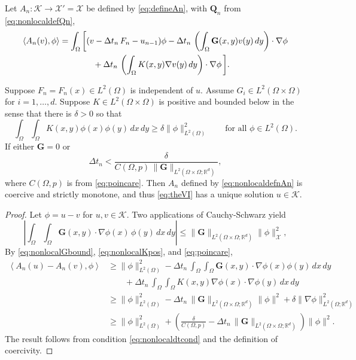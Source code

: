 \documentclass[final,onefignum]{siamart190516}
\newcommand\bG{\mathbf{G}}
\newcommand\bQ{\mathbf{Q}}
\newcommand{\grad}{\nabla}
\newcommand{\ip}[2]{\ensuremath{\left<#1,#2\right>}}
\newcommand\RR{\mathbb{R}}
\begin{document}
Let $A_n:\mathcal{K} \to \mathcal{X}'=\mathcal{X}$ be defined by \eqref{eq:defineAn}, with $\bQ_n$ from \eqref{eq:nonlocaldefQn},
\begin{align}
    \ip{A_n(v)}{\phi} &= \int_\Omega \bigg[(v - \Delta t_n\,F_n - u_{n-1})\phi - \Delta t_n\,\left(\int_\Omega \bG(x,y) v(y)\,dy\right)\cdot \grad \phi \label{eq:nonlocaldefnAn} \\
                      &\qquad\qquad + \Delta t_n\,\left(\int_\Omega K(x,y) \grad v(y)\,dy\right)\cdot \grad \phi\,\bigg]. \notag
\end{align}

\begin{theorem}  \label{thm:nonlocalwellposed}  Suppose $F_n=F_n(x) \in L^2(\Omega)$ is independent of $u$.  Assume $G_i \in L^2(\Omega\times\Omega)$ for $i=1,\dots,d$.  Suppose $K \in L^2(\Omega\times\Omega)$ is positive and bounded below \cite{PorterStirling1990} in the sense that there is $\delta>0$ so that
\begin{equation}
   \int_\Omega \int_\Omega K(x,y) \phi(x) \phi(y)\,dx\,dy \ge \delta \|\phi\|_{L^2(\Omega)}^2 \qquad \text{for all } \phi \in L^2(\Omega).  \label{eq:nonlocalKpos}
\end{equation}
If either $\bG=0$ or
\begin{equation}
  \Delta t_n < \frac{\delta}{C(\Omega,p)\, \|\bG\|_{L^2(\Omega\times\Omega;\RR^d)}},  \label{eq:nonlocaldtcond}
\end{equation}
where $C(\Omega,p)$ is from \eqref{eq:poincare}.  Then $A_n$ defined by \eqref{eq:nonlocaldefnAn} is coercive and strictly monotone, and thus \eqref{eq:theVI} has a unique solution $u\in\mathcal{K}$.
\end{theorem}

\begin{proof}  Let $\phi=u-v$ for $u,v\in\mathcal{K}$.  Two applications of Cauchy-Schwarz yield
\begin{equation}
\left|\int_\Omega \int_\Omega \bG(x,y) \cdot \grad \phi(x)\,\phi(y) \,dx\,dy\right|
  \le \|\bG\|_{L^2(\Omega\times\Omega;\RR^d)} \|\phi\|_{\mathcal{X}}^2,   \label{eq:nonlocalGbound}
\end{equation}
By \eqref{eq:nonlocalGbound}, \eqref{eq:nonlocalKpos}, and \eqref{eq:poincare},
\begin{align*}
\ip{A_n(u)-A_n(v)}{\phi} &\ge \|\phi\|_{L^2(\Omega)}^2 - \Delta t_n\,\int_\Omega \int_\Omega \bG(x,y) \cdot \grad \phi(x) \phi(y)\,dx\,dy \\
    &\qquad + \Delta t_n\,\int_\Omega \int_\Omega K(x,y) \grad \phi(x) \cdot \grad \phi(y)\,dx\,dy \\
    &\ge \|\phi\|_{L^2(\Omega)}^2 - \Delta t_n\,\|\bG\|_{L^2(\Omega\times\Omega;\RR^d)} \|\phi\|^2 + \delta \|\grad\phi\|_{L^2(\Omega;\RR^d)}^2 \\
    &\ge \|\phi\|_{L^2(\Omega)}^2 + \left(\frac{\delta}{C(\Omega,p)} - \Delta t_n\,\|\bG\|_{L^2(\Omega\times\Omega;\RR^d)}\right) \|\phi\|^2.
\end{align*}
The result follows from condition \eqref{eq:nonlocaldtcond} and the definition of coercivity. \end{proof}
\end{document}
